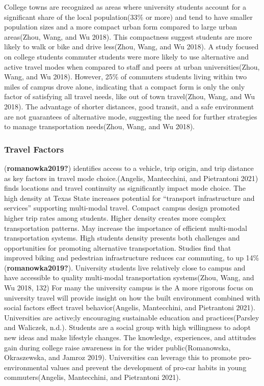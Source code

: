 \documentclass[
  letterpaper,
  DIV=11,
  numbers=noendperiod]{scrartcl}
\begin{document}
College towns are recognized as areas where university students account
for a significant share of the local population(33\% or more) and tend
to have smaller population sizes and a more compact urban form compared
to large urban areas(Zhou, Wang, and Wu 2018). This compactness suggest
students are more likely to walk or bike and drive less(Zhou, Wang, and
Wu 2018). A study focused on college students commuter students were
more likely to use alternative and active travel modes when compared to
staff and peers at urban universities(Zhou, Wang, and Wu 2018). However,
25\% of commuters students living within two miles of campus drove
alone, indicating that a compact form is only the only factor of
satisfying all travel needs, like out of town travel(Zhou, Wang, and Wu
2018). The advantage of shorter distances, good transit, and a safe
environment are not guarantees of alternative mode, suggesting the need
for further strategies to manage transportation needs(Zhou, Wang, and Wu
2018).

\subsubsection{Travel Factors}\label{travel-factors}

(\textbf{romanowka2019?}) identifies access to a vehicle, trip origin,
and trip distance as key factors in travel mode choice.(Angelis,
Mantecchini, and Pietrantoni 2021) finds locations and travel continuity
as significantly impact mode choice. The high density at Texas State
increases potential for ``transport infrastructure and services''
supporting multi-modal travel. Compact campus design promoted higher
trip rates among students. Higher density creates more complex
transportation patterns. May increase the importance of efficient
multi-modal transportation systems. High students density presents both
challenges and opportunities for promoting alternative transportation.
Studies find that improved biking and pedestrian infrastructure reduces
car commuting, to up 14\%(\textbf{romanowka2019?}). University students
live relatively close to campus and have accessible to quality
multi-modal transportation systems(Zhou, Wang, and Wu 2018, 132) For
many the university campus is the A more rigorous focus on university
travel will provide insight on how the built environment combined with
social factors effect travel behavior(Angelis, Mantecchini, and
Pietrantoni 2021). Universities are active;ly encouraging sustainable
education and practices(Parsley and Waliczek, n.d.). Students are a
social group with high willingness to adopt new ideas and make lifestyle
changes. The knowledge, experiences, and attitudes gain during college
raise awareness in for the wider public(Romanowska, Okraszewska, and
Jamroz 2019). Universities can leverage this to promote
pro-environmental values and prevent the development of pro-car habits
in young commuters(Angelis, Mantecchini, and Pietrantoni 2021).
\end{document}
